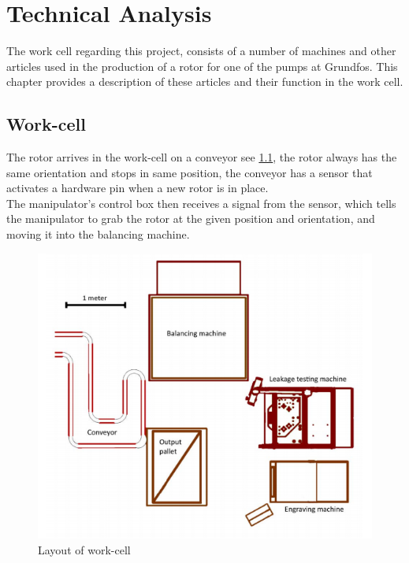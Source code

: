  \chapter{Technical Analysis} \label{TechAnalysis}
 
 The work cell regarding this project, consists of a number of machines and other articles used in the production of a rotor for one of the pumps at Grundfos. This chapter provides a description of these articles and their function in the work cell\cite{robotsave}.\\
 
 \section{Work-cell}
 The rotor arrives in the work-cell on a conveyor see \ref{fig:Layoutworkcell}, the rotor always has the same orientation and stops in same position, the conveyor has a sensor that activates a hardware pin when a new rotor is in place.\\
 The manipulator's control box then receives a signal from the sensor, which tells the manipulator to grab the rotor at the given position and orientation, and moving it into the balancing machine.\\
 
 \begin{figure}[h!]
    \centering
    \includegraphics[scale=.5]{TechnicalAnlysis/layout.PNG}
    \caption{Layout of work-cell\cite{Case}}
    \label{fig:Layoutworkcell}
\end{figure}

